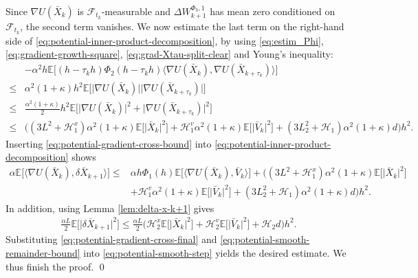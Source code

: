 \documentclass[12pt]{article}
\numberwithin{equation}{section}
\renewenvironment{proof}%
  {\begin{trivlist}%
   \item[]\ignorespaces}%
  {\qed\end{trivlist}}
\renewcommand{\H}{\mathcal{H}}
\begin{document}
\begin{proof}
\begin{equation}
\end{equation}
Since $\nabla U(\bar{X}_k)$ is $\mathcal{F}_{t_k}$-measurable and $\Delta W_{k+1}^{\Phi_3,1}$ has mean zero conditioned on $\mathcal{F}_{t_k}$, the second term vanishes.
We now estimate the last term on the right-hand side of \eqref{eq:potential-inner-product-decomposition}, 
%
by using \eqref{eq:estim_Phi}, \eqref{eq:gradient-growth-square}, \eqref{eq:grad-Xtau-split-clear} and Young's inequality:
\begin{equation}
\label{eq:potential-gradient-cross-bound}
\begin{aligned}
&-
\alpha^2h
\mathbb{E}
\Big[
(h-\tau_kh)\Phi_2(h-\tau_kh)
\big\langle
\nabla U(\bar{X}_k),
\nabla U(\bar{X}_{k+\tau_k})
\big\rangle
\Big]
\\
\leq&
\alpha^2(1+\kappa)h^2
\mathbb{E}
\Big[
\big|
\nabla U(\bar{X}_k)
\big|
\big|
\nabla U(\bar{X}_{k+\tau_k})
\big|
\Big]
\\
\leq&
\tfrac{\alpha^2(1+\kappa)}{2}h^2
\mathbb{E}
\Big[
\big|
\nabla U(\bar{X}_k)
\big|^2
+
\big|
\nabla U(\bar{X}_{k+\tau_k})
\big|^2
\Big]
\\
\leq    &
\Big(
(3L^2+\H_1^x)
\alpha^2(1+\kappa)
\mathbb{E}
\Big[
\big|
\bar{X}_k
\big|^2
\Big]
+
\H_1^v
\alpha^2(1+\kappa)
\mathbb{E}
\Big[
\big|
\bar{V}_k
\big|^2
\Big]
+
(3L_2^2+\H_1)
\alpha^2(1+\kappa)
d
\Big)
h^2.
\end{aligned}
\end{equation}
Inserting \eqref{eq:potential-gradient-cross-bound} into \eqref{eq:potential-inner-product-decomposition} shows
\begin{equation}
\label{eq:potential-gradient-cross-final}
\begin{aligned}
\alpha
\mathbb{E}
\Big[
\big\langle
\nabla U(\bar{X}_k),
\delta \bar{X}_{k+1}
\big\rangle
\Big]
\leq    & 
\alpha h\Phi_1(h)
\mathbb{E}
\Big[
\big\langle
\nabla U(\bar{X}_k),
\bar{V}_k
\big\rangle
\Big]
+
\Big(
(3L^2+\H_1^x)
\alpha^2(1+\kappa)
\mathbb{E}
\Big[
\big|
\bar{X}_k
\big|^2
\Big]
\\   &
+
\H_1^v
\alpha^2(1+\kappa)
\mathbb{E}
\Big[
\big|
\bar{V}_k
\big|^2
\Big]
+
(3L_2^2+\H_1)
\alpha^2(1+\kappa)
d
\Big)
h^2.
\end{aligned}
\end{equation}
In addition, using Lemma \ref{lem:delta-x-k+1} gives
\begin{equation}
\label{eq:potential-smooth-remainder-bound}
\begin{aligned}
\tfrac{\alpha L}{2}
\mathbb{E}
\Big[
\big|
\delta \bar{X}_{k+1}
\big|^2
\Big]
\leq
\tfrac{\alpha L}{2}
\Big(
\H_2^x
\mathbb{E}
\Big[
\big|
\bar{X}_k
\big|^2
\Big]
+
\H_2^v
\mathbb{E}
\Big[
\big|
\bar{V}_k
\big|^2
\Big]
+
\H_2d
\Big)h^2.
\end{aligned}
\end{equation}
Substituting  \eqref{eq:potential-gradient-cross-final} and \eqref{eq:potential-smooth-remainder-bound} into \eqref{eq:potential-smooth-step} yields the desired estimate. We thus finish the proof.
\end{proof}
\end{document}
